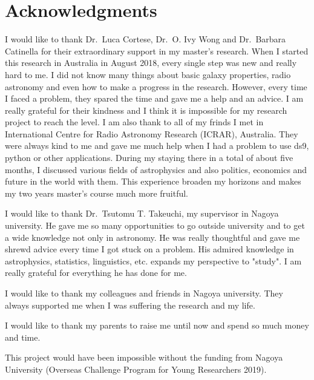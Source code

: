 \chapter*{\Large Acknowledgments}

I would like to thank Dr.\ Luca Cortese, Dr.\ O. Ivy Wong and Dr.\ Barbara Catinella for their extraordinary support in my master's research.
When I started this research in Australia in August 2018, every single step was new and really hard to me.
I did not know many things about basic galaxy properties, radio astronomy and even how to make a progress in the research.
However, every time I faced a problem, they spared the time and gave me a help and an advice.
I am really grateful for their kindness and I think it is impossible for my research project to reach the level.
I am also thank to all of my frinds I met in International Centre for Radio Astronomy Research (ICRAR), Australia.
They were always kind to me and gave me much help when I had a problem to use ds9, python or other applications.
During my staying there in a total of about five months, I discussed various fields of astrophysics and also politics, economics and future in the world with them.
This experience broaden my horizons and makes my two years master's course much more fruitful.

I would like to thank Dr.\ Tsutomu T. Takeuchi, my supervisor in Nagoya university.
He gave me so many opportunities to go outside university and to get a wide knowledge not only in astronomy.
He was really thoughtful and gave me shrewd advice every time I got stuck on a problem.
His admired knowledge in astrophysics, statistics, linguistics, etc. expands my perspective to "study".
I am really grateful for everything he has done for me.

I would like to thank my colleagues and friends in Nagoya university.
They always supported me when I was suffering the research and my life.

I would like to thank my parents to raise me until now and spend so much money and time.

This project would have been impossible without the funding from Nagoya University (Overseas Challenge Program for Young Researchers 2019).
